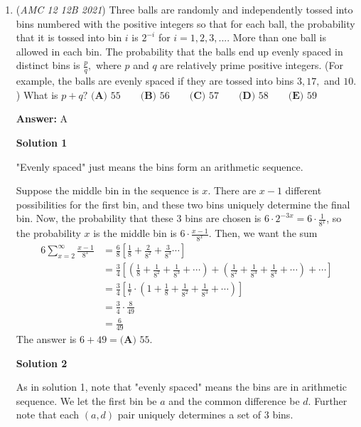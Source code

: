\begin{enumerate}
\textbf{Solution 7 (Cheese by answer choices)}

Since c,d,e can be played once to obtain b, and b can be played once to obtain a, we assume that b must be the answer.

 


	\item (\textit{AMC 12 12B 2021}) Three balls are randomly and independently tossed into bins numbered with the positive integers so that for each ball, the probability that it is tossed into bin $i$ is $2^{-i}$ for $i=1,2,3,....$ More than one ball is allowed in each bin. The probability that the balls end up evenly spaced in distinct bins is $\frac pq,$ where $p$ and $q$ are relatively prime positive integers. (For example, the balls are evenly spaced if they are tossed into bins $3,17,$ and $10.$) What is $p+q?$
$\textbf{(A) }55 \qquad \textbf{(B) }56 \qquad \textbf{(C) }57\qquad \textbf{(D) }58 \qquad \textbf{(E) }59$

 \textbf{Answer: }A



\textbf{Solution 1}

"Evenly spaced" just means the bins form an arithmetic sequence.

 Suppose the middle bin in the sequence is $x$. There are $x-1$ different possibilities for the first bin, and these two bins uniquely determine the final bin. Now, the probability that these $3$ bins are chosen is $6\cdot 2^{-3x} = 6\cdot \frac{1}{8^x}$, so the probability $x$ is the middle bin is $6\cdot\frac{x-1}{8^x}$. Then, we want the sum
 \begin{align*} 6\sum_{x=2}^{\infty}\frac{x-1}{8^x} &= \frac{6}{8}\left[\frac{1}{8} + \frac{2}{8^2} + \frac{3}{8^3}\cdots\right]\\ &= \frac34\left[\left(\frac{1}{8} + \frac{1}{8^2} + \frac{1}{8^3}+\cdots \right) + \left(\frac{1}{8^2} + \frac{1}{8^3} + \frac{1}{8^4} + \cdots \right) + \cdots\right]\\ &= \frac34\left[\frac17\cdot \left(1 + \frac{1}{8} + \frac{1}{8^2} + \frac{1}{8^3} + \cdots \right)\right]\\ &= \frac34\cdot \frac{8}{49}\\ &= \frac{6}{49} \end{align*}
The answer is $6+49=\boxed{\textbf{(A) }55}.$




\textbf{Solution 2}

As in solution 1, note that "evenly spaced" means the bins are in arithmetic sequence. We let the first bin be $a$ and the common difference be $d$. Further note that each $(a, d)$ pair uniquely determines a set of $3$ bins. 


\end{enumerate}
